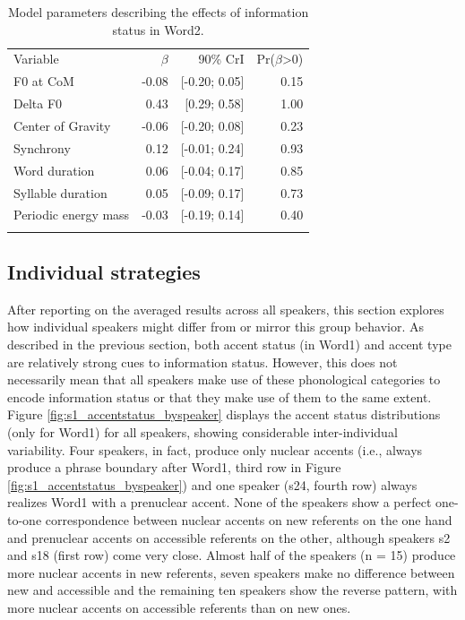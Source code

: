 \begin{table}[]
\begin{tabular}{lrrr}
\lsptoprule
\multicolumn{4}{c}{Word2} \\ \hline
Variable    & $\beta$ & 90\% CrI  & Pr($\beta$\textgreater{}0) \\ \hline
F0 at CoM    & -0.08       & {[}-0.20; 0.05{]}  & 0.15                          \\
Delta F0    & 0.43       & {[}0.29; 0.58{]}  & 1.00                          \\
Center of Gravity            & -0.06       & {[}-0.20; 0.08{]}  & 0.23                          \\
Synchrony            & 0.12       & {[}-0.01; 0.24{]}  & 0.93                          \\
Word duration            & 0.06       & {[}-0.04; 0.17{]}  & 0.85                          \\
Syllable duration & 0.05       & {[}-0.09; 0.17{]}  & 0.73                             \\
Periodic energy mass         & -0.03       & {[}-0.19; 0.14{]} & 0.40                          \\
\lspbottomrule
\end{tabular}
\caption{Model parameters describing the effects of information status in Word2.}
\label{table:model_parameters_Word2}
\end{table}

\subsection{Individual strategies}

After reporting on the averaged results across all speakers, this section explores how individual speakers might differ from or mirror this group behavior. As described in the previous section, both accent status (in Word1) and accent type are relatively strong cues to information status. However, this does not necessarily mean that all speakers make use of these phonological categories to encode information status or that they make use of them to the same extent. Figure \ref{fig:s1_accentstatus_byspeaker} displays the accent status distributions (only for Word1) for all speakers, showing considerable inter-individual variability. Four speakers, in fact, produce only nuclear accents (i.e., always produce a phrase boundary after Word1, third row in Figure \ref{fig:s1_accentstatus_byspeaker}) and one speaker (s24, fourth row) always realizes Word1 with a prenuclear accent. None of the speakers show a perfect one-to-one correspondence between nuclear accents on new referents on the one hand and prenuclear accents on accessible referents on the other, although speakers s2 and s18 (first row) come very close. Almost half of the speakers (n = 15) produce more nuclear accents in new referents, seven speakers make no difference between new and accessible and the remaining ten speakers show the reverse pattern, with more nuclear accents on accessible referents than on new ones.

